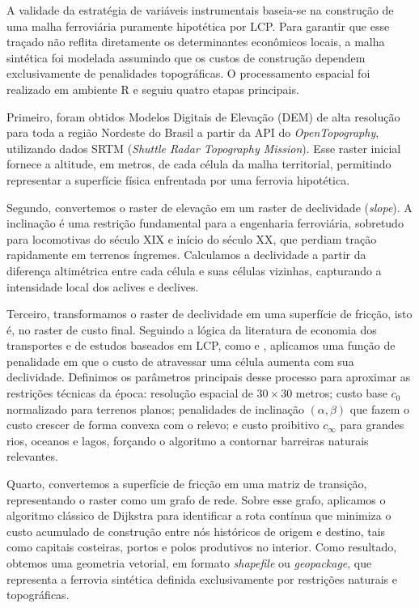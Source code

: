 \documentclass[12pt,a4paper]{article}
\begin{document}
A validade da estratégia de variáveis instrumentais baseia-se na construção de uma malha ferroviária puramente hipotética por LCP. Para garantir que esse traçado não reflita diretamente os determinantes econômicos locais, a malha sintética foi modelada assumindo que os custos de construção dependem exclusivamente de penalidades topográficas. O processamento espacial foi realizado em ambiente R e seguiu quatro etapas principais.

Primeiro, foram obtidos Modelos Digitais de Elevação (DEM) de alta resolução para toda a região Nordeste do Brasil a partir da API do \textit{OpenTopography}, utilizando dados SRTM (\textit{Shuttle Radar Topography Mission}). Esse raster inicial fornece a altitude, em metros, de cada célula da malha territorial, permitindo representar a superfície física enfrentada por uma ferrovia hipotética.

Segundo, convertemos o raster de elevação em um raster de declividade (\textit{slope}). A inclinação é uma restrição fundamental para a engenharia ferroviária, sobretudo para locomotivas do século XIX e início do século XX, que perdiam tração rapidamente em terrenos íngremes. Calculamos a declividade a partir da diferença altimétrica entre cada célula e suas células vizinhas, capturando a intensidade local dos aclives e declives.

Terceiro, transformamos o raster de declividade em uma superfície de fricção, isto é, no raster de custo final. Seguindo a lógica da literatura de economia dos transportes e de estudos baseados em LCP, como \citet{berger2017} e \citet{donaldson2018}, aplicamos uma função de penalidade em que o custo de atravessar uma célula aumenta com sua declividade. Definimos os parâmetros principais desse processo para aproximar as restrições técnicas da época: resolução espacial de $30 \times 30$ metros; custo base $c_0$ normalizado para terrenos planos; penalidades de inclinação $(\alpha,\beta)$ que fazem o custo crescer de forma convexa com o relevo; e custo proibitivo $c_{\infty}$ para grandes rios, oceanos e lagos, forçando o algoritmo a contornar barreiras naturais relevantes.

Quarto, convertemos a superfície de fricção em uma matriz de transição, representando o raster como um grafo de rede. Sobre esse grafo, aplicamos o algoritmo clássico de Dijkstra para identificar a rota contínua que minimiza o custo acumulado de construção entre nós históricos de origem e destino, tais como capitais costeiras, portos e polos produtivos no interior. Como resultado, obtemos uma geometria vetorial, em formato \textit{shapefile} ou \textit{geopackage}, que representa a ferrovia sintética definida exclusivamente por restrições naturais e topográficas.
\end{document}
